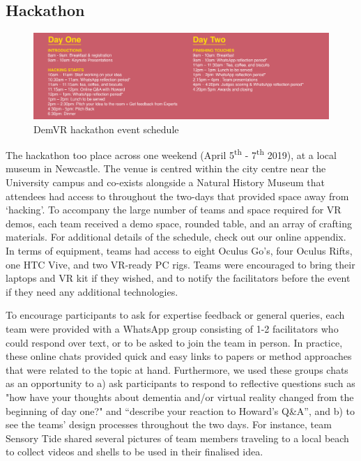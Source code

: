 \subsection{Hackathon}

\begin{figure}[htp]
\centering
\includegraphics[width=1\linewidth]{Images/DemVR/DemVRHackathonSchedule.png}
\caption{DemVR hackathon event schedule}
\label{fig:schedule}
\end{figure}
The hackathon too place across one weekend (April 5\textsuperscript{th} - 7\textsuperscript{th} 2019), at a local museum in Newcastle. The venue is centred within the city centre near the University campus and co-exists alongside a Natural History Museum that attendees had access to throughout the two-days that provided space away from ‘hacking’. To accompany the large number of teams and space required for VR demos, each team received a demo space, rounded table, and an array of crafting materials. For additional details of the schedule, check out our online appendix. In terms of equipment, teams had access to eight Oculus Go’s, four Oculus Rifts, one HTC Vive, and two VR-ready PC rigs. Teams were encouraged to bring their laptops and VR kit if they wished, and to notify the facilitators before the event if they need any additional technologies.

To encourage participants to ask for expertise feedback or general queries, each team were provided with a WhatsApp group consisting of 1-2 facilitators who could respond over text, or to be asked to join the team in person. In practice, these online chats provided quick and easy links to papers or method approaches that were related to the topic at hand. Furthermore, we used these groups chats as an opportunity to a) ask participants to respond to reflective questions such as "how have your thoughts about dementia and/or virtual reality changed from the beginning of day one?" and “describe your reaction to Howard’s Q\&A”, and b) to see the teams’ design processes throughout the two days. For instance, team Sensory Tide shared several pictures of team members traveling to a local beach to collect videos and shells to be used in their finalised idea. 

